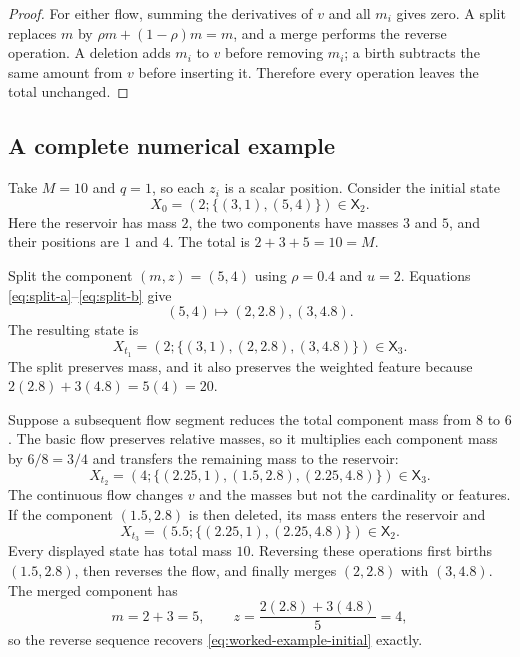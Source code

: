 \documentclass[10pt]{article}
\theoremstyle{definition}
\theoremstyle{remark}
\newcommand{\state}{\mathsf{X}}
\begin{document}
\begin{proof}
For either flow, summing the derivatives of $v$ and all $m_i$ gives zero.  A split replaces $m$ by $\rho m+(1-\rho)m=m$, and a merge performs the reverse operation.  A deletion adds $m_i$ to $v$ before removing $m_i$; a birth subtracts the same amount from $v$ before inserting it.  Therefore every operation leaves the total unchanged.
\end{proof}

\subsection{A complete numerical example}

Take $M=10$ and $q=1$, so each $z_i$ is a scalar position.  Consider the
initial state
\begin{equation}
  X_0=\left(2;\{(3,1),(5,4)\}\right)\in\state_2.
  \label{eq:worked-example-initial}
\end{equation}
Here the reservoir has mass $2$, the two components have masses $3$ and $5$,
and their positions are $1$ and $4$.  The total is $2+3+5=10=M$.

Split the component $(m,z)=(5,4)$ using $\rho=0.4$ and $u=2$.  Equations
\eqref{eq:split-a}--\eqref{eq:split-b} give
\begin{equation}
  (5,4)\longmapsto(2,2.8),(3,4.8).
  \label{eq:worked-example-split}
\end{equation}
The resulting state is
\begin{equation}
  X_{t_1}=\left(2;\{(3,1),(2,2.8),(3,4.8)\}\right)
  \in\state_3.
  \label{eq:worked-example-after-split}
\end{equation}
The split preserves mass, and it also preserves the weighted feature because
$2(2.8)+3(4.8)=5(4)=20$.

Suppose a subsequent flow segment reduces the total component mass from
$8$ to $6$.  The basic flow preserves relative masses, so it multiplies
each component mass by $6/8=3/4$ and transfers the remaining mass to the
reservoir:
\begin{equation}
  X_{t_2}
  =\left(4;\{(2.25,1),(1.5,2.8),(2.25,4.8)\}\right)
  \in\state_3.
  \label{eq:worked-example-after-flow}
\end{equation}
The continuous flow changes $v$ and the masses but not the cardinality or
features.  If the component $(1.5,2.8)$ is then deleted, its mass enters the
reservoir and
\begin{equation}
  X_{t_3}
  =\left(5.5;\{(2.25,1),(2.25,4.8)\}\right)
  \in\state_2.
  \label{eq:worked-example-after-deletion}
\end{equation}
Every displayed state has total mass $10$.  Reversing these operations first
births $(1.5,2.8)$, then reverses the flow, and finally merges
$(2,2.8)$ with $(3,4.8)$.  The merged component has
\begin{equation}
  m=2+3=5,
  \qquad
  z=\frac{2(2.8)+3(4.8)}{5}=4,
\end{equation}
so the reverse sequence recovers \eqref{eq:worked-example-initial} exactly.
\end{document}
